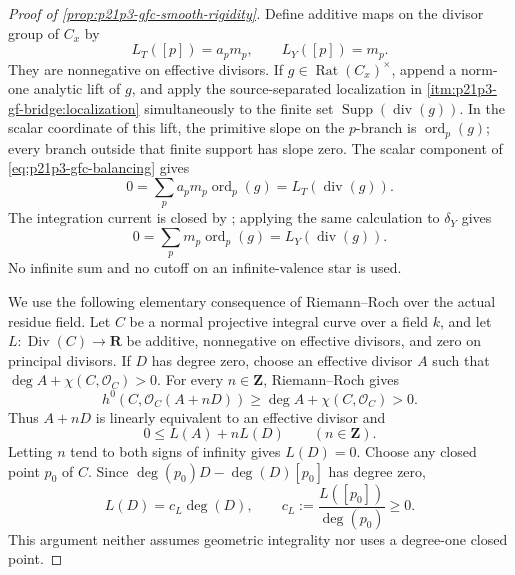 \begin{proof}[Proof of \cref{prop:p21p3-gfc-smooth-rigidity}]
Define additive maps on the divisor group of $C_x$ by
\begin{equation}
\label{eq:p21p3-gfc-divisor-functionals}
 L_T([p])=a_pm_p,
 \qquad
 L_Y([p])=m_p.
\end{equation}
They are nonnegative on effective divisors.  If
$g\in\operatorname{Rat}(C_x)^\times$, append a norm-one analytic lift
of $g$, and apply the source-separated localization in
\cref{itm:p21p3-gf-bridge:localization} simultaneously to the finite set
$\operatorname{Supp}(\operatorname{div}(g))$.  In the scalar coordinate
of this lift, the primitive slope on the $p$-branch is
$\operatorname{ord}_p(g)$; every branch outside that finite support has
slope zero.  The scalar component of
\eqref{eq:p21p3-gfc-balancing} gives
\begin{equation}
\label{eq:p21p3-gfc-T-principal}
       0=\sum_p a_pm_p\operatorname{ord}_p(g)
        =L_T(\operatorname{div}(g)).
\end{equation}
The integration current is closed by \cite[\S7.7.4]{CLD25}; applying the
same calculation to $\delta_Y$ gives
\begin{equation}
\label{eq:p21p3-gfc-Y-principal}
       0=\sum_p m_p\operatorname{ord}_p(g)
        =L_Y(\operatorname{div}(g)).
\end{equation}
No infinite sum and no cutoff on an infinite-valence star is used.

We use the following elementary consequence of Riemann--Roch over the
actual residue field.  Let $C$ be a normal projective integral curve over
a field $k$, and let
$L:\operatorname{Div}(C)\to\mathbf R$ be additive, nonnegative on
effective divisors, and zero on principal divisors.  If $D$ has degree
zero, choose an effective divisor $A$ such that
$\deg A+\chi(C,\mathcal O_C)>0$.
For every $n\in\mathbf Z$, Riemann--Roch gives
\[
 h^0(C,\mathcal O_C(A+nD))
 \geq \deg A+\chi(C,\mathcal O_C)>0.
\]
Thus $A+nD$ is linearly equivalent to an effective divisor and
\[
                         0\leq L(A)+nL(D)
                         \qquad(n\in\mathbf Z).
\]
Letting $n$ tend to both signs of infinity gives $L(D)=0$.  Choose
any closed point $p_0$ of $C$.  Since
$\deg(p_0)D-\deg(D)[p_0]$
has degree zero,
\begin{equation}
\label{eq:p21p3-gfc-degree-functional}
                 L(D)=c_L\deg(D),
 \qquad
                 c_L:=\frac{L([p_0])}{\deg(p_0)}\geq0.
\end{equation}
This argument neither assumes geometric integrality nor uses a degree-one
closed point.


\end{proof}
